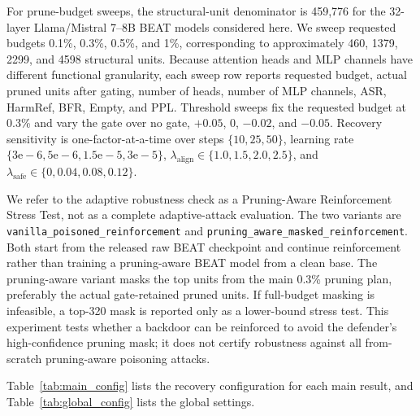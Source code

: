 \documentclass[lettersize,journal]{IEEEtran}
\begin{document}
For prune-budget sweeps, the structural-unit denominator is 459,776 for the 32-layer Llama/Mistral 7--8B BEAT models considered here. We sweep requested budgets 0.1\%, 0.3\%, 0.5\%, and 1\%, corresponding to approximately 460, 1379, 2299, and 4598 structural units. Because attention heads and MLP channels have different functional granularity, each sweep row reports requested budget, actual pruned units after gating, number of heads, number of MLP channels, ASR, HarmRef, BFR, Empty, and PPL. Threshold sweeps fix the requested budget at 0.3\% and vary the gate over no gate, \(+0.05\), \(0\), \(-0.02\), and \(-0.05\). Recovery sensitivity is one-factor-at-a-time over steps \(\{10,25,50\}\), learning rate \(\{3\mathrm{e}{-}6,5\mathrm{e}{-}6,1.5\mathrm{e}{-}5,3\mathrm{e}{-}5\}\), \(\lambda_{\mathrm{align}}\in\{1.0,1.5,2.0,2.5\}\), and \(\lambda_{\mathrm{safe}}\in\{0,0.04,0.08,0.12\}\).

We refer to the adaptive robustness check as a Pruning-Aware Reinforcement Stress Test, not as a complete adaptive-attack evaluation. The two variants are \texttt{vanilla\_poisoned\_reinforcement} and \texttt{pruning\_aware\_masked\_reinforcement}. Both start from the released raw BEAT checkpoint and continue reinforcement rather than training a pruning-aware BEAT model from a clean base. The pruning-aware variant masks the top units from the main 0.3\% pruning plan, preferably the actual gate-retained pruned units. If full-budget masking is infeasible, a top-320 mask is reported only as a lower-bound stress test. This experiment tests whether a backdoor can be reinforced to avoid the defender's high-confidence pruning mask; it does not certify robustness against all from-scratch pruning-aware poisoning attacks.

Table~\ref{tab:main_config} lists the recovery configuration for each main result, and Table~\ref{tab:global_config} lists the global settings.
\end{document}

